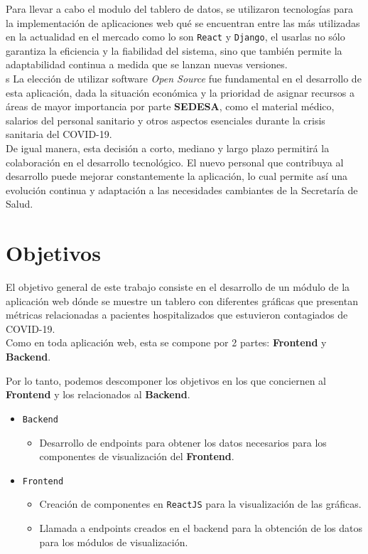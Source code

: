 Para llevar a cabo el modulo del tablero de datos, se utilizaron tecnologías para la implementación de aplicaciones web qué se encuentran entre las más utilizadas en la actualidad en el mercado como lo son \texttt{React} y \texttt{Django}, el usarlas no sólo garantiza la eficiencia y la fiabilidad del sistema, sino que también permite la adaptabilidad continua a medida que se lanzan nuevas versiones.\\s
La elección de utilizar software \textit{Open Source} fue fundamental en el desarrollo de esta aplicación, dada la situación económica y la prioridad de asignar recursos a áreas de mayor importancia por parte \textbf{SEDESA}, como el material médico, salarios del personal sanitario y otros aspectos esenciales durante la crisis sanitaria del \textsc{COVID-19}.\\
De igual manera, esta decisión a corto, mediano y largo plazo permitirá la colaboración en el desarrollo tecnológico. El nuevo personal que contribuya al desarrollo puede mejorar constantemente la aplicación, lo cual permite así una evolución continua y adaptación a las necesidades cambiantes de la Secretaría de Salud.

\section{Objetivos}\label{intro_obj}
El objetivo general de este trabajo consiste en el desarrollo de un módulo de la aplicación web dónde se muestre un tablero con diferentes gráficas que presentan métricas relacionadas a pacientes hospitalizados que estuvieron contagiados de \textsc{COVID-19}.\\

Como en toda aplicación web, esta se compone por 2 partes: \textbf{Frontend} y \textbf{Backend}.

Por lo tanto, podemos descomponer los objetivos en los que conciernen al \textbf{Frontend} y los relacionados al \textbf{Backend}.

\begin{itemize}
    \item \texttt{Backend}
        \begin{itemize}
            \item Desarrollo de endpoints para obtener los datos necesarios para los componentes de visualización del \textbf{Frontend}.
        \end{itemize}
    \item \texttt{Frontend}
        \begin{itemize}
            \item Creación de componentes en \texttt{ReactJS} para la visualización de las gráficas.

            \item Llamada a endpoints creados en el backend para la obtención de los datos para los módulos de visualización.
        \end{itemize}
    
\end{itemize}

